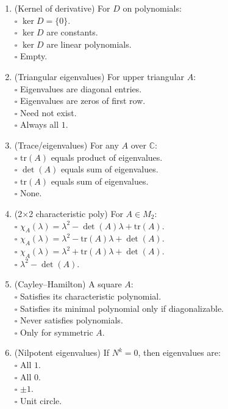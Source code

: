 \documentclass[11pt]{article}
\begin{document}
\begin{enumerate}
\item (Kernel of derivative) For $D$ on polynomials:\\
\(\square\) $\ker D=\{0\}$.\\
\(\square\) $\ker D$ are constants.\\
\(\square\) $\ker D$ are linear polynomials.\\
\(\square\) Empty.

\item (Triangular eigenvalues) For upper triangular $A$:\\
\(\square\) Eigenvalues are diagonal entries.\\
\(\square\) Eigenvalues are zeros of first row.\\
\(\square\) Need not exist.\\
\(\square\) Always all $1$.

\item (Trace/eigenvalues) For any $A$ over $\mathbb{C}$:\\
\(\square\) $\mathrm{tr}(A)$ equals product of eigenvalues.\\
\(\square\) $\det(A)$ equals sum of eigenvalues.\\
\(\square\) $\mathrm{tr}(A)$ equals sum of eigenvalues.\\
\(\square\) None.

\item (2×2 characteristic poly) For $A\in M_2$:\\
\(\square\) $\chi_A(\lambda)=\lambda^2-\det(A)\lambda+\mathrm{tr}(A)$.\\
\(\square\) $\chi_A(\lambda)=\lambda^2-\mathrm{tr}(A)\lambda+\det(A)$.\\
\(\square\) $\chi_A(\lambda)=\lambda^2+\mathrm{tr}(A)\lambda+\det(A)$.\\
\(\square\) $\lambda^2-\det(A)$.

\item (Cayley–Hamilton) A square $A$:\\
\(\square\) Satisfies its characteristic polynomial.\\
\(\square\) Satisfies its minimal polynomial only if diagonalizable.\\
\(\square\) Never satisfies polynomials.\\
\(\square\) Only for symmetric $A$.

\item (Nilpotent eigenvalues) If $N^k=0$, then eigenvalues are:\\
\(\square\) All $1$.\\
\(\square\) All $0$.\\
\(\square\) $\pm 1$.\\
\(\square\) Unit circle.


\end{enumerate}
\end{document}
